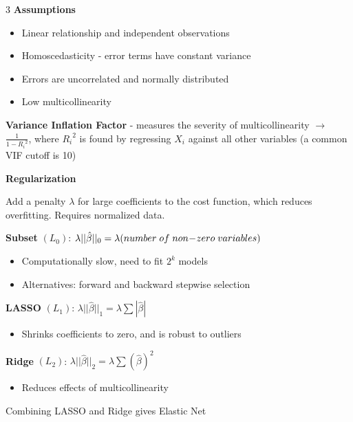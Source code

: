 \documentclass[10pt,landscape,letterpaper]{article}
\begin{document}
\begin{multicols}{3}
\textbf{Assumptions}
\begin{itemize}[label={--},leftmargin=4mm]
\vspace{-1mm}
\itemsep -.4mm
    \item Linear relationship and independent observations
    \item Homoscedasticity - error terms have constant variance
    \item Errors are uncorrelated and normally distributed
    \item Low multicollinearity
\end{itemize}

\textbf{Variance Inflation Factor} - measures the severity of multicollinearity $\to$ $\frac{1}{1-{R_i}^2}$, where ${R_i}^2$ is found by regressing $X_i$ against all other variables (a common VIF cutoff is 10)

\textbf{Regularization}

Add a penalty $\lambda$ for large coefficients to the cost function, which reduces overfitting. Requires normalized data.

\textbf{Subset}  $(L_0)$: $\lambda ||\hat{\beta}||_0 = \lambda (number \;of\;non\hspace{-.7mm}-\hspace{-.7mm}zero\; variables)$
\begin{itemize}[label={--},leftmargin=4mm]
\vspace{-1mm}
\itemsep -.4mm
\item Computationally slow, need to fit $2^k$ models
\item Alternatives: forward and backward stepwise selection
\end{itemize}
\textbf{LASSO} $(L_1)$: $\lambda ||\hat{\beta}||_1 = \lambda\sum | \hat{\beta} |$
\begin{itemize}[label={--},leftmargin=4mm]
\vspace{-1mm}
\itemsep -.4mm
\item Shrinks coefficients to zero, and is robust to outliers
\end{itemize}
\textbf{Ridge}  $(L_2)$: $\lambda ||\hat{\beta}||_2 = \lambda\sum( \hat{\beta})^2$
\begin{itemize}[label={--},leftmargin=4mm]
\vspace{-1mm}
\itemsep -.4mm
\item Reduces effects of multicollinearity
\end{itemize}
Combining LASSO and Ridge gives Elastic Net\\


\end{multicols}
\end{document}
